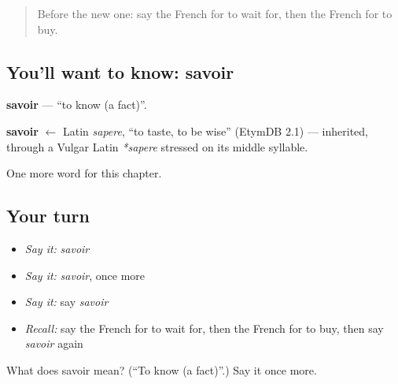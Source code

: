 \label{lesson:FR-C64-savoir}



\begin{quote}
Before the new one: say the French for to wait for, then the French for to buy.
\end{quote}

\subsection*{You'll want to know: savoir}
\textbf{savoir} — \textquotedblleft{}to know (a fact)\textquotedblright{}.

\begin{cousinweb}
\textbf{savoir} $\leftarrow$ Latin \emph{sapere}, \textquotedblleft{}to taste, to be wise\textquotedblright{} (EtymDB 2.1) — inherited, through a Vulgar Latin \emph{*sapere} stressed on its middle syllable.
\end{cousinweb}

\begin{grammarlens}[title={What you've built}]
One more word for this chapter.
\end{grammarlens}

\subsection*{Your turn}
\begin{itemize}
\raggedright
  \item \emph{Say it:} \emph{savoir}
  \item \emph{Say it:} \emph{savoir}, once more
  \item \emph{Say it:} say \emph{savoir}
  \item \emph{Recall:} say the French for to wait for, then the French for to buy, then say \emph{savoir} again
\end{itemize}

\begin{tcolorbox}[breakable,colback=teal!4,colframe=teal!35!black,title={Before you move on}]
What does savoir mean? (\textquotedblleft{}To know (a fact)\textquotedblright{}.) Say it once more.
\end{tcolorbox}
